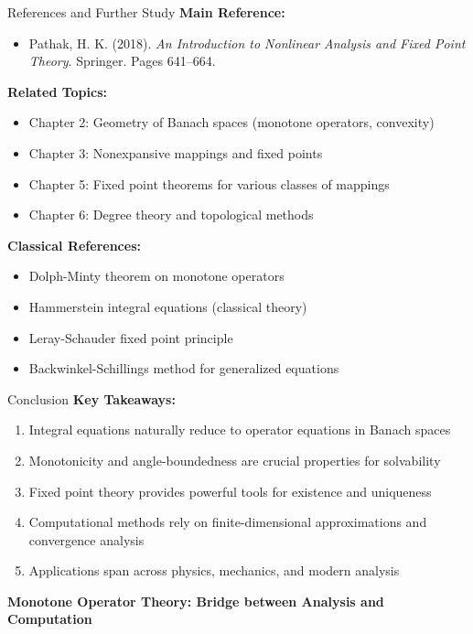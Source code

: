 \documentclass[aspectratio=169,10pt]{beamer}
\theoremstyle{plain}
\theoremstyle{definition}
\begin{document}
\begin{frame}{References and Further Study}
  \vspace{0.3cm}
  \textbf{Main Reference:}
  \begin{itemize}
    \item Pathak, H. K. (2018). \textit{An Introduction to Nonlinear Analysis and Fixed Point Theory}. Springer. Pages 641--664.
  \end{itemize}

  \vspace{0.3cm}
  \textbf{Related Topics:}
  \begin{itemize}
    \item Chapter 2: Geometry of Banach spaces (monotone operators, convexity)
    \item Chapter 3: Nonexpansive mappings and fixed points
    \item Chapter 5: Fixed point theorems for various classes of mappings
    \item Chapter 6: Degree theory and topological methods
  \end{itemize}

  \vspace{0.3cm}
  \textbf{Classical References:}
  \begin{itemize}
    \item Dolph-Minty theorem on monotone operators
    \item Hammerstein integral equations (classical theory)
    \item Leray-Schauder fixed point principle
    \item Backwinkel-Schillings method for generalized equations
  \end{itemize}
\end{frame}

\begin{frame}{Conclusion}
  \vspace{0.5cm}
  \textbf{Key Takeaways:}

  \begin{enumerate}
    \item \large Integral equations naturally reduce to operator equations in Banach spaces

    \item Monotonicity and angle-boundedness are crucial properties for solvability

    \item Fixed point theory provides powerful tools for existence and uniqueness

    \item Computational methods rely on finite-dimensional approximations and convergence analysis

    \item Applications span across physics, mechanics, and modern analysis
  \end{enumerate}

  \vspace{0.5cm}
  \centering \Large \textbf{Monotone Operator Theory: Bridge between Analysis and Computation}
\end{frame}
\end{document}
